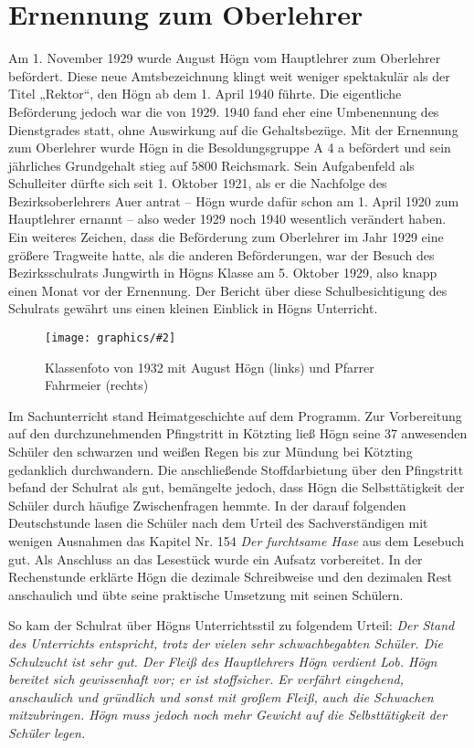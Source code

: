 \documentclass{book}
\newcommand{\img}[2][width=\linewidth]{\noindent\texttt{[image: graphics/\#2]}}
\begin{document}
\section{Ernennung zum Oberlehrer}

Am 1. November 1929 wurde August Högn vom Hauptlehrer zum Oberlehrer
befördert. Diese neue Amtsbezeichnung klingt weit weniger spektakulär
als der Titel „Rektor“, den Högn ab dem 1. April 1940 führte. Die
eigentliche Beförderung jedoch war die von 1929. 1940 fand eher eine
Umbenennung des Dienstgrades statt, ohne Auswirkung auf die
Gehaltsbezüge. Mit der Ernennung zum Oberlehrer wurde Högn in die
Besoldungsgruppe A 4 a befördert und sein jährliches Grundgehalt stieg
auf 5800 Reichsmark. Sein Aufgabenfeld als Schulleiter dürfte sich
seit 1. Oktober 1921, als er die Nachfolge des Bezirksoberlehrers Auer
antrat – Högn wurde dafür schon am 1. April 1920 zum Hauptlehrer
ernannt – also weder 1929 noch 1940 wesentlich verändert haben. Ein
weiteres Zeichen, dass die Beförderung zum Oberlehrer im Jahr 1929 eine
größere Tragweite hatte, als die anderen Beförderungen, war der
Besuch des Bezirksschulrats Jungwirth in Högns Klasse am 5. Oktober
1929, also knapp einen Monat vor der Ernennung. Der Bericht über diese
Schulbesichtigung des Schulrats gewährt uns einen kleinen Einblick in
Högns Unterricht.

\begin{figure}
\img{Klassenfoto-1932}
\caption{Klassenfoto von 1932 mit August Högn (links) und Pfarrer
Fahrmeier (rechts)}
\end{figure}

Im Sachunterricht stand Heimatgeschichte auf dem Programm. Zur
Vorbereitung auf den durchzunehmenden Pfingstritt in Kötzting ließ
Högn seine 37 anwesenden Schüler den schwarzen und weißen Regen bis zur
Mündung bei Kötzting gedanklich durchwandern. Die anschließende
Stoffdarbietung über den Pfingstritt befand der Schulrat als gut,
bemängelte jedoch, dass Högn die Selbsttätigkeit der Schüler durch
häufige Zwischenfragen hemmte. In der darauf folgenden Deutschstunde
lasen die Schüler nach dem Urteil des Sachverständigen mit wenigen
Ausnahmen das Kapitel Nr. 154 \textit{Der furchtsame Hase} aus dem
Lesebuch gut. Als Anschluss an das Lesestück wurde ein Aufsatz
vorbereitet. In der Rechenstunde erklärte Högn die dezimale
Schreibweise und den dezimalen Rest anschaulich und übte seine
praktische Umsetzung mit seinen Schülern.

So kam der Schulrat über Högns Unterrichtsstil zu folgendem Urteil:
\textit{Der Stand des Unterrichts entspricht, trotz der vielen sehr
schwachbegabten Schüler. Die Schulzucht ist sehr gut. Der Fleiß des
Hauptlehrers Högn verdient Lob. Högn bereitet sich gewissenhaft vor;
er ist stoffsicher. Er verfährt eingehend, anschaulich und gründlich
und sonst mit großem Fleiß, auch die Schwachen mitzubringen. Högn muss
jedoch noch mehr Gewicht auf die Selbsttätigkeit der Schüler legen.}
\end{document}
